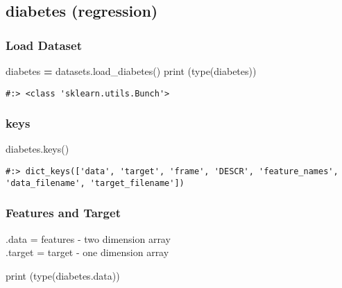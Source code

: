 \documentclass[
]{book}
\newenvironment{Shaded}{\begin{snugshade}}{\end{snugshade}}
\newcommand{\BuiltInTok}[1]{#1}
\newcommand{\NormalTok}[1]{#1}
\newcommand{\OperatorTok}[1]{\textcolor[rgb]{0.43,0.43,0.43}{\textbf{#1}}}
\begin{document}
\hypertarget{diabetes-regression}{%
\subsection{diabetes (regression)}\label{diabetes-regression}}

\hypertarget{load-dataset}{%
\subsubsection{Load Dataset}\label{load-dataset}}

\begin{Shaded}
\begin{Highlighting}[]
\NormalTok{diabetes }\OperatorTok{=}\NormalTok{ datasets.load\_diabetes()}
\BuiltInTok{print}\NormalTok{ (}\BuiltInTok{type}\NormalTok{(diabetes))}
\end{Highlighting}
\end{Shaded}

\begin{verbatim}
#:> <class 'sklearn.utils.Bunch'>
\end{verbatim}

\hypertarget{keys}{%
\subsubsection{keys}\label{keys}}

\begin{Shaded}
\begin{Highlighting}[]
\NormalTok{diabetes.keys()}
\end{Highlighting}
\end{Shaded}

\begin{verbatim}
#:> dict_keys(['data', 'target', 'frame', 'DESCR', 'feature_names', 'data_filename', 'target_filename'])
\end{verbatim}

\hypertarget{features-and-target}{%
\subsubsection{Features and Target}\label{features-and-target}}

.data = features - two dimension array\\
.target = target - one dimension array

\begin{Shaded}
\begin{Highlighting}[]
\BuiltInTok{print}\NormalTok{ (}\BuiltInTok{type}\NormalTok{(diabetes.data))}
\end{Highlighting}
\end{Shaded}
\end{document}
